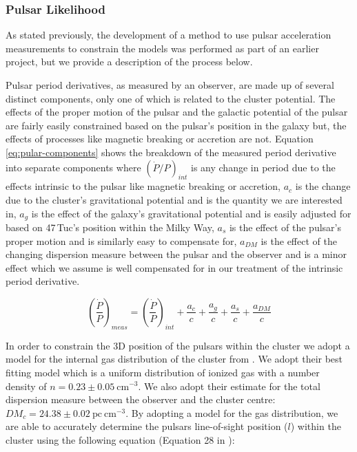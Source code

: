 \subsubsection{Pulsar Likelihood}

As stated previously, the development of a method to use pulsar acceleration measurements to
constrain the models was performed as part of an earlier project, but we provide a description
of the process below.


Pulsar period derivatives, as measured by an observer, are made up of several distinct components,
only one of which is related to the cluster potential. The effects of the proper motion of the
pulsar and the galactic potential of the pulsar are fairly easily constrained based on the pulsar's
position in the galaxy but, the effects of processes like magnetic breaking or accretion are not.
Equation \ref{eq:pular-components} shows the breakdown of the measured period derivative into
separate components where $(\dot{P}/P)_{int}$ is any change in period due to the effects intrinsic
to the pulsar like magnetic breaking or accretion, $a_c$ is the change due to the cluster's
gravitational potential and is the quantity we are interested in, $a_g$ is the effect of the
galaxy's gravitational potential and is easily adjusted for based on 47\,Tuc's position within the
Milky Way, $a_s$ is the effect of the pulsar's proper motion and is similarly easy to compensate
for, $a_{DM}$ is the effect of the changing dispersion measure between the pulsar and the observer
and is a minor effect which we assume is well compensated for in our treatment of the intrinsic
period derivative.

\begin{equation}
    \left(\frac{\dot{P}}{P}\right)_{meas} = \left(\frac{\dot{P}}{P}\right)_{int} + \frac{a_c}{c} +
    \frac{a_g}{c} + \frac{a_s}{c} + \frac{a_{DM}}{c}
    \label{eq:pular-components}
\end{equation}



In order to constrain the 3D position of the pulsars within the cluster we adopt a model for the
internal gas distribution of the cluster from \citet{Abbate2018}. We adopt their best fitting model
which is a uniform distribution of ionized gas with a number density of $n = 0.23 \pm 0.05 \
    \text{cm}^{-3}$. We also adopt their estimate for the total dispersion measure between the observer
and the cluster centre: $DM_c = 24.38 \pm 0.02 \ \mathrm{pc \ cm}^{-3}$. By adopting a model for the
gas distribution, we are able to accurately determine the pulsars line-of-sight position ($l$)
within the cluster using the following equation (Equation 28 in \citet{Abbate2018}):

